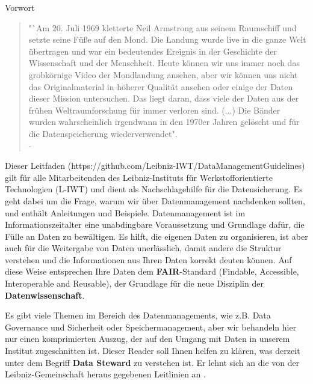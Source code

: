 \thispagestyle{empty}
\begin{center}
  \large\headerfont{}\textcolor{iwtdark}{Vorwort}
\end{center}

\begin{quote}
  "`Am 20. Juli 1969 kletterte Neil Armstrong aus seinem Raumschiff und setzte
  seine Füße auf den Mond. Die Landung wurde live in die ganze Welt übertragen
  und war ein bedeutendes Ereignis in der Geschichte der Wissenschaft und der
  Menschheit. Heute können wir uns immer noch das grobkörnige Video der
  Mondlandung ansehen, aber wir können uns nicht das Originalmaterial in höherer
  Qualität ansehen oder einige der Daten dieser Mission untersuchen. Das
  liegt daran, dass viele der Daten aus der frühen Weltraumforschung für immer
  verloren sind. ($\ldots$) Die Bänder wurden wahrscheinlich irgendwann in den 1970er
  Jahren gelöscht und für die Datenspeicherung wiederverwendet". \\
  \null\hfill - \citeauthor{briney2015}\cite{briney2015}
\end{quote}

\noindent Dieser Leitfaden (https://github.com/Leibniz-IWT/DataManagementGuidelines) gilt für alle Mitarbeitenden des Leibniz-Instituts für Werkstofforientierte Technologien (L-IWT) und
dient als Nachschlagehilfe für die Datensicherung. Es geht dabei um die Frage,
warum wir über Datenmanagement nachdenken sollten, und enthält Anleitungen und
Beispiele. Datenmanagement ist im Informationszeitalter eine unabdingbare
Voraussetzung und Grundlage dafür, die Fülle an Daten zu bewältigen. Es hilft,
die eigenen Daten zu organisieren, ist aber auch für die Weitergabe von Daten
unerlässlich, damit andere die Struktur verstehen und die Informationen aus
Ihren Daten korrekt deuten können. Auf diese Weise entsprechen Ihre Daten dem
\textbf{FAIR}-Standard (Findable, Accessible, Interoperable and Reusable), der
Grundlage für die neue Disziplin der \textbf{Datenwissenschaft}.

Es gibt viele Themen im Bereich des Datenmanagements, wie z.B. Data Governance
und Sicherheit oder Speichermanagement, aber wir behandeln hier nur einen
komprimierten Auszug, der auf den Umgang mit Daten in unserem Institut
zugeschnitten ist. Dieser Reader soll Ihnen helfen zu klären, was derzeit unter dem Begriff \textbf{Data Steward} zu verstehen ist. Er lehnt sich an die von der Leibniz-Gemeinschaft heraus gegebenen Leitlinien an \cite{leibniz2018}.
